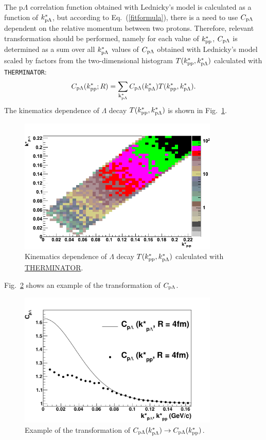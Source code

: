 The p$\Lambda$ correlation function obtained with Lednicky's model is calculated as a function of $k^{*}_{\rm p\Lambda}$, but according to Eq.~(\ref{fitformula}), there is a need to use $C_{\rm p\Lambda}$ dependent on the relative momentum between two protons. Therefore, relevant transformation should be performed, namely for each value of $k^{*}_{\rm pp}$, $C_{\rm p\Lambda}$ is determined as a sum over all $k^{*}_{\rm p\Lambda}$ values of $C_{\rm p\Lambda}$ obtained with Lednicky's model scaled by factors from the two-dimensional histogram $T(k^*_{\rm pp},k^*_{\rm p\Lambda})$ calculated with \verb|THERMINATOR|:
\begin{equation}
  C_{\rm p\Lambda} (k^*_{\rm pp};R) = \sum\limits_{\rm k^*_{\rm p\Lambda}} {C_{\rm p\Lambda} (k^*_{\rm p\Lambda}) T(k^*_{\rm pp},k^*_{\rm p\Lambda})}.
\end{equation}
The kinematics dependence of $\Lambda$ decay $T(k^*_{\rm pp},k^*_{\rm p\Lambda})$ is shown in Fig.~\ref{Tkplakpp}.
\begin{figure}%
  \centering
  \includegraphics[width=0.85\textwidth]{Tkplakpp}
  \caption{Kinematics dependence of $\Lambda$ decay $T(k^*_{\rm pp},k^*_{\rm p\Lambda})$ calculated with \protect\url{THERMINATOR}.}
  \label{Tkplakpp}
\end{figure}
Fig.~\ref{cpla} shows an example of the transformation of $C_{\rm p\Lambda}$.
\begin{figure}%
  \centering
  \includegraphics[width=0.85\textwidth]{cpla}
  \caption{Example of the transformation of $C_{\rm p\Lambda}(k^*_{\rm p\Lambda}) \rightarrow C_{\rm p\Lambda}(k^*_{\rm pp})$.}
  \label{cpla}
\end{figure}

